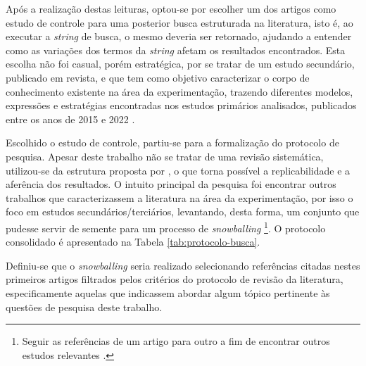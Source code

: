 Após a realização destas leituras, optou-se por escolher um dos artigos como estudo de controle para uma posterior busca estruturada na literatura, isto é, ao executar a \textit{string} de busca, o mesmo deveria ser retornado, ajudando a entender como as variações dos termos da \textit{string} afetam os resultados encontrados. Esta escolha não foi casual, porém estratégica, por se tratar de um estudo secundário, publicado em revista, e que tem como objetivo caracterizar o corpo de conhecimento existente na área da experimentação, trazendo diferentes modelos, expressões e estratégias encontradas nos estudos primários analisados, publicados entre os anos de 2015 e 2022 \cite{erthal_characterization_2023}.


Escolhido o estudo de controle, partiu-se para a formalização do protocolo de pesquisa. Apesar deste trabalho não se tratar de uma revisão sistemática, utilizou-se da estrutura proposta por , o que torna possível a replicabilidade e a aferência dos resultados. O intuito principal da pesquisa foi encontrar outros trabalhos que caracterizassem a literatura na área da experimentação, por isso o foco em estudos secundários/terciários, levantando, desta forma, um conjunto que pudesse servir de semente para um processo de \textit{snowballing} \footnote{Seguir as referências de um artigo para outro a fim de encontrar outros estudos relevantes \cite{runeson2009}.}. O protocolo consolidado é apresentado na Tabela \ref{tab:protocolo-busca}.

Definiu-se que o \textit{snowballing} seria realizado selecionando referências citadas nestes primeiros artigos filtrados pelos critérios do protocolo de revisão da literatura, especificamente aquelas que indicassem abordar algum tópico pertinente às questões de pesquisa deste trabalho.


